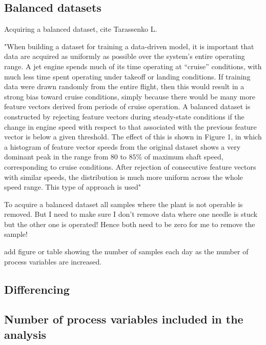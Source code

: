     
    
    
    
     
     
    \subsection{Balanced datasets}
    
            Acquiring a balanced dataset, cite Tarassenko L. 
    
    "When building a dataset for training a data-driven model, it is important that data are acquired as uniformly as possible over the system’s entire operating range. A jet engine spends much of its time operating at “cruise” conditions, with much less time spent operating under takeoff or landing conditions. If training data were drawn randomly from the entire flight, then this would result in a strong bias toward cruise conditions, simply because there would be many more feature vectors derived from periods of cruise operation. A balanced dataset is constructed by rejecting feature vectors during steady-state conditions if the change in engine speed with respect to that associated with the previous feature vector is below a given threshold. The effect of this is shown in Figure 1, in which a histogram of feature vector speeds from the original dataset shows a very dominant peak in the range from 80 to $85\%$ of maximum shaft speed, corresponding to cruise conditions. After rejection of consecutive feature vectors with similar speeds, the distribution is much more uniform across the whole speed range. This type of approach is used"
    
    To acquire a balanced dataset all samples where the plant is not operable is removed. But I need to make sure I don't remove data where one needle is stuck but the other one is operated! Hence both need to be zero for me to remove the sample! 
    
    
    add figure or table showing the number of samples each day as the number of process variables are increased. 
    
    
    \subsection{Differencing}
    
    
    \subsection{Number of process variables included in the analysis}